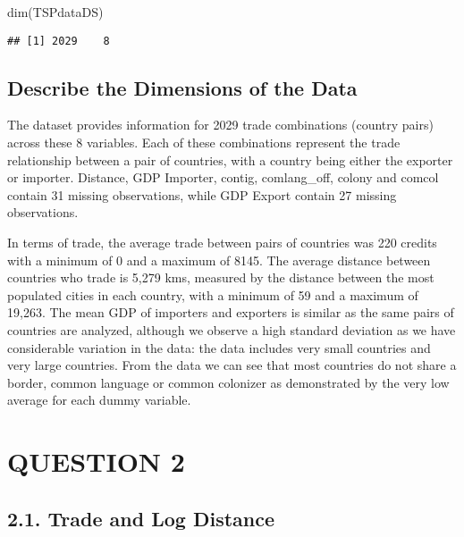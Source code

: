 \documentclass[
]{article}
\newenvironment{Shaded}{\begin{snugshade}}{\end{snugshade}}
\newcommand{\FunctionTok}[1]{\textcolor[rgb]{0.00,0.00,0.00}{#1}}
\newcommand{\NormalTok}[1]{#1}
\begin{document}
\begin{Shaded}
\begin{Highlighting}[]
\FunctionTok{dim}\NormalTok{(TSPdataDS)}
\end{Highlighting}
\end{Shaded}

\begin{verbatim}
## [1] 2029    8
\end{verbatim}

\hypertarget{describe-the-dimensions-of-the-data}{%
\subsection{Describe the Dimensions of the
Data}\label{describe-the-dimensions-of-the-data}}

The dataset provides information for 2029 trade combinations (country
pairs) across these 8 variables. Each of these combinations represent
the trade relationship between a pair of countries, with a country being
either the exporter or importer. Distance, GDP Importer, contig,
comlang\_off, colony and comcol contain 31 missing observations, while
GDP Export contain 27 missing observations.

In terms of trade, the average trade between pairs of countries was 220
credits with a minimum of 0 and a maximum of 8145. The average distance
between countries who trade is 5,279 kms, measured by the distance
between the most populated cities in each country, with a minimum of 59
and a maximum of 19,263. The mean GDP of importers and exporters is
similar as the same pairs of countries are analyzed, although we observe
a high standard deviation as we have considerable variation in the data:
the data includes very small countries and very large countries. From
the data we can see that most countries do not share a border, common
language or common colonizer as demonstrated by the very low average for
each dummy variable.

\hypertarget{question-2}{%
\section{QUESTION 2}\label{question-2}}

\hypertarget{trade-and-log-distance}{%
\subsection{2.1. Trade and Log Distance}\label{trade-and-log-distance}}
\end{document}

